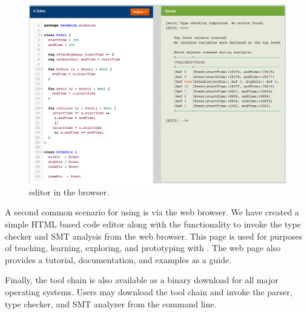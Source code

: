 \begin{figure}
\centering
\includegraphics[scale=0.32]{kweb.png}
\caption{\Klang{} editor in the browser.}
\label{fig:k}
\end{figure}

A second common scenario for using \Klang{} is via the web browser. We
have created a simple HTML based \Klang{} code editor along with the
functionality to invoke the type checker and SMT analysis from the web
browser. This page is used for purposes of teaching, learning,
exploring, and prototyping with \Klang{}. The web page also provides a
tutorial, documentation, and \Klang{} examples as a guide. 

Finally, the \Klang{} tool chain is also available as a binary
download for all major operating systems. Users may download the tool
chain and invoke the \Klang{} parser, type checker, and SMT analyzer
from the command line.

